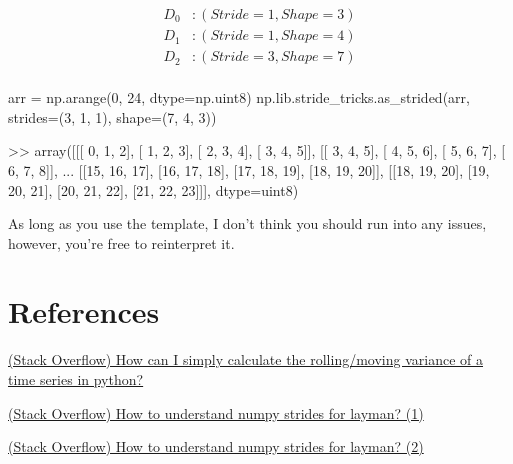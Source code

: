 \documentclass[oneside, 12pt]{report}
\begin{document}
\begin{align*}
D_0&:(Stride=1, Shape=3)\\
D_1&:(Stride=1, Shape=4)\\
D_2&:(Stride=3, Shape=7)\\
\end{align*}

\begin{python}
arr = np.arange(0, 24, dtype=np.uint8)
np.lib.stride_tricks.as_strided(arr, strides=(3, 1, 1), shape=(7, 4, 3))

>> array([[[ 0,  1,  2],
           [ 1,  2,  3],
           [ 2,  3,  4],
           [ 3,  4,  5]],
          [[ 3,  4,  5],
           [ 4,  5,  6],
           [ 5,  6,  7],
           [ 6,  7,  8]], 
           ...
          [[15, 16, 17],
           [16, 17, 18],
           [17, 18, 19],
           [18, 19, 20]],
          [[18, 19, 20],
           [19, 20, 21],
           [20, 21, 22],
           [21, 22, 23]]], dtype=uint8)
\end{python}

As long as you use the template, I don't think you should run into any issues, however, you're free to reinterpret it.

\section{References}

\href{https://stackoverflow.com/a/59322185}{(Stack Overflow) How can I simply calculate the rolling/moving variance of a time series in python?}

\href{https://stackoverflow.com/a/53099870}{(Stack Overflow) How to understand numpy strides for layman? (1)}

\href{https://stackoverflow.com/a/53224165}{(Stack Overflow) How to understand numpy strides for layman? (2)}
\end{document}
